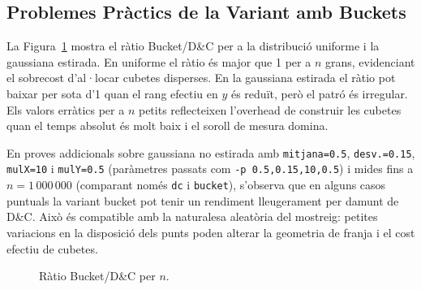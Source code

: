 \documentclass[conference,compsoc]{IEEEtran}
\begin{document}
\subsection{Problemes Pràctics de la Variant amb Buckets}

La Figura~\ref{fig:ratio_bucket} mostra el ràtio Bucket/D\&C per a la
distribució uniforme i la gaussiana estirada. En uniforme el ràtio és
major que 1 per a $n$ grans, evidenciant el sobrecost d'al·locar cubetes
disperses. En la gaussiana estirada el ràtio pot baixar per sota d'1
quan el rang efectiu en $y$ és reduït, però el patró és irregular. Els
valors erràtics per a $n$ petits reflecteixen l'overhead de construir
les cubetes quan el temps absolut és molt baix i el soroll de mesura domina.

En proves addicionals sobre gaussiana no estirada amb
\texttt{mitjana=0.5}, \texttt{desv.=0.15}, \texttt{mulX=10} i
\texttt{mulY=0.5} (paràmetres passats com
\texttt{-p 0.5,0.15,10,0.5}) i mides fins a $n=1\,000\,000$
(comparant només \texttt{dc} i \texttt{bucket}), s'observa que en alguns
casos puntuals la variant bucket pot tenir un rendiment lleugerament per damunt de D\&C.
Això és compatible amb la naturalesa aleatòria del mostreig: petites
variacions en la disposició dels punts poden alterar la geometria de
franja i el cost efectiu de cubetes.

\begin{figure}[H]
    \centering
    \ratiodata
    \caption{Ràtio Bucket/D\&C per $n$.}
    \label{fig:ratio_bucket}
\end{figure}
\end{document}
